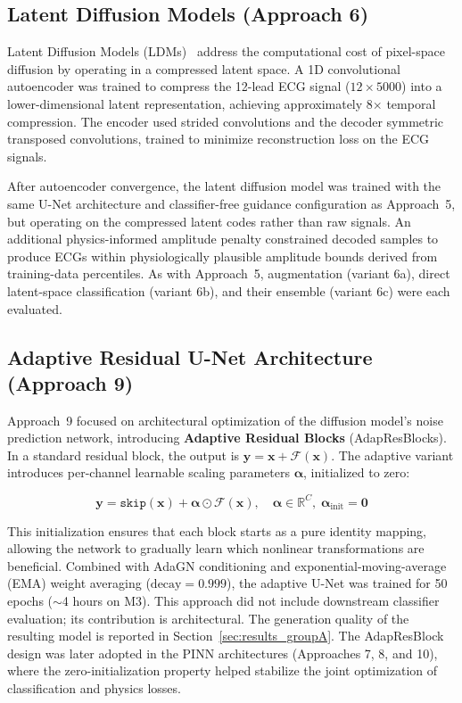 \subsection{Latent Diffusion Models (Approach 6)}
\label{sec:ldm}

Latent Diffusion Models (LDMs)~\cite{rombach2022highresolution} address the computational cost of pixel-space diffusion by operating in a compressed latent space. A 1D convolutional autoencoder was trained to compress the 12-lead ECG signal ($12 \times 5000$) into a lower-dimensional latent representation, achieving approximately 8$\times$ temporal compression. The encoder used strided convolutions and the decoder symmetric transposed convolutions, trained to minimize reconstruction loss on the ECG signals.

After autoencoder convergence, the latent diffusion model was trained with the same U-Net architecture and classifier-free guidance configuration as Approach~5, but operating on the compressed latent codes rather than raw signals. An additional physics-informed amplitude penalty constrained decoded samples to produce ECGs within physiologically plausible amplitude bounds derived from training-data percentiles. As with Approach~5, augmentation (variant 6a), direct latent-space classification (variant 6b), and their ensemble (variant 6c) were each evaluated.

\subsection{Adaptive Residual U-Net Architecture (Approach 9)}
\label{sec:adaptive_unet}

Approach~9 focused on architectural optimization of the diffusion model's noise prediction network, introducing \textbf{Adaptive Residual Blocks} (AdapResBlocks). In a standard residual block, the output is $\mathbf{y} = \mathbf{x} + \mathcal{F}(\mathbf{x})$. The adaptive variant introduces per-channel learnable scaling parameters $\boldsymbol{\alpha}$, initialized to zero:

\begin{equation}
    \mathbf{y} = \texttt{skip}(\mathbf{x}) + \boldsymbol{\alpha} \odot \mathcal{F}(\mathbf{x}), \quad \boldsymbol{\alpha} \in \mathbb{R}^{C},\; \boldsymbol{\alpha}_{\text{init}} = \mathbf{0}
\end{equation}

This initialization ensures that each block starts as a pure identity mapping, allowing the network to gradually learn which nonlinear transformations are beneficial. Combined with AdaGN conditioning and exponential-moving-average (EMA) weight averaging ($\text{decay} = 0.999$), the adaptive U-Net was trained for 50 epochs ($\sim$4 hours on M3). This approach did not include downstream classifier evaluation; its contribution is architectural. The generation quality of the resulting model is reported in Section~\ref{sec:results_groupA}. The AdapResBlock design was later adopted in the PINN architectures (Approaches 7, 8, and 10), where the zero-initialization property helped stabilize the joint optimization of classification and physics losses.

